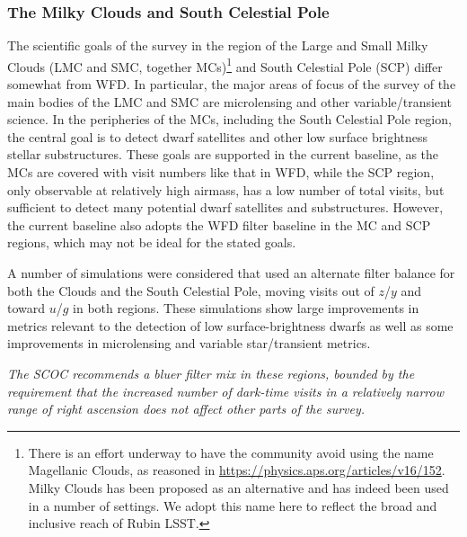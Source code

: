 \subsubsection{The Milky Clouds and South Celestial Pole}\label{sec:subG:specialregions}

The scientific goals of the survey in the region of the Large and Small Milky Clouds (LMC and SMC, together MCs)\footnote{There is an effort underway to have the community avoid using the name Magellanic Clouds, as reasoned in \url{https://physics.aps.org/articles/v16/152}. Milky Clouds has been proposed as an alternative and has indeed been used in a number of settings. We adopt this name here to reflect the broad and inclusive reach of Rubin LSST.} and South Celestial Pole (SCP) differ somewhat from WFD. In particular, the major areas of focus of the survey of the main bodies of the LMC and SMC are microlensing and other variable/transient science. In the peripheries of the MCs, including the South Celestial Pole region, the central goal is to detect dwarf satellites and other low surface brightness stellar substructures.
These goals are supported in the current baseline, as the MCs are covered with visit numbers like that in WFD, while the SCP region, only observable at relatively high airmass, has a low number of total visits, but sufficient to detect many potential dwarf satellites and substructures. However, the current baseline also adopts the WFD filter baseline in the MC and SCP regions, which may not be ideal for the stated goals.


A number of simulations were considered that used an alternate filter balance for both the Clouds and the South Celestial Pole, moving visits out of $z$/$y$ and toward $u$/$g$ in both regions. These simulations show large improvements in metrics relevant to the detection of low surface-brightness dwarfs as well as some improvements in microlensing and variable star/transient metrics. 

{\it The SCOC recommends a bluer filter mix in these regions, bounded by the requirement that the increased number of dark-time visits in a relatively narrow range of right ascension does not affect other parts of the survey.} 


